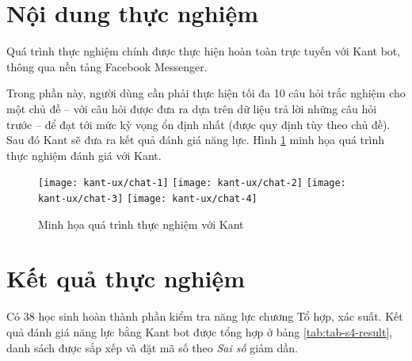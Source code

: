 \section{Nội dung thực nghiệm}
Quá trình thực nghiệm chính được thực hiện hoàn toàn trực tuyến với Kant bot, thông qua nền tảng Facebook Messenger.\par
Trong phần này, người dùng cần phải thực hiện tối đa 10 câu hỏi trắc nghiệm cho một chủ đề – với câu hỏi được đưa ra dựa trên dữ liệu trả lời những câu hỏi trước – để đạt tới mức kỳ vọng ổn định nhất (được quy định tùy theo chủ đề). Sau đó Kant sẽ đưa ra kết quả đánh giá năng lực. Hình \ref{fig:fig-c4-chatbot-demo} minh họa quá trình thực nghiệm đánh giá với Kant.
\begin{figure}[htb!]\centering
	\texttt{[image: kant-ux/chat-1]}
	\texttt{[image: kant-ux/chat-2]}
	\texttt{[image: kant-ux/chat-3]}
	\texttt{[image: kant-ux/chat-4]}
	\caption{Minh họa quá trình thực nghiệm với Kant}
	\label{fig:fig-c4-chatbot-demo}
\end{figure}\par

\section{Kết quả thực nghiệm}

Có 38 học sinh hoàn thành phần kiểm tra năng lực chương Tổ hợp, xác suất. Kết quả đánh giá năng lực bằng Kant bot được tổng hợp ở bảng \ref{tab:tab-s4-result}, danh sách được sắp xếp và đặt mã số theo \textit{Sai số} giảm dần.

